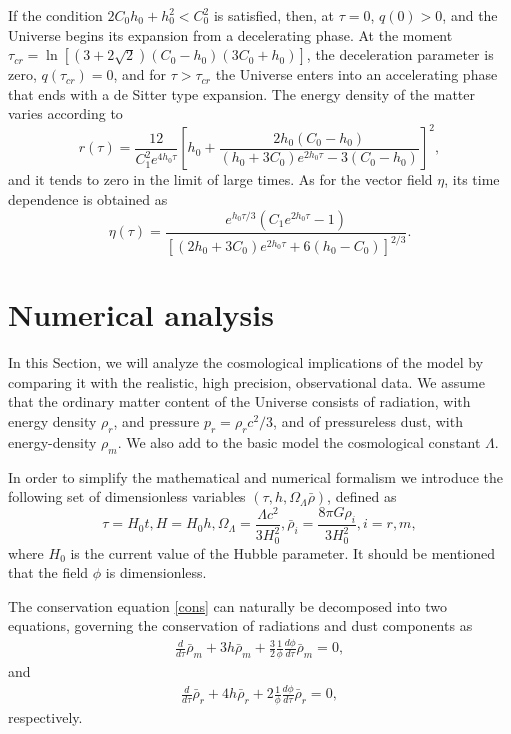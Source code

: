 \documentclass[aps,superscriptaddress, showpacs,preprintnumbers, superscriptaddress, nofootinbibt,twocolumn]{revtex4-2}
\def\be{\begin{equation}}
\def\ee{\end{equation}}
\begin{document}
If the condition  $2C_0h_0+h_0^2<C_0^2$ is satisfied, then, at $\tau =0$, $q(0)>0$, and the Universe begins its expansion from a decelerating phase. At the moment $\tau _{cr}=\ln \left[\left(3+2\sqrt{2}\right)\left(C_0-h_0\right)\left(3C_0+h_0\right)\right]$, the deceleration parameter is zero, $q\left(\tau _{cr}\right)=0$, and for $\tau >\tau_{cr}$ the Universe enters into an accelerating phase that ends with a de Sitter type expansion. The energy density of the matter varies according to
\be
r(\tau)=\frac{12}{C_1^2e^{4h_0\tau}}\left[h_0+\frac{2h_0\left(C_0-h_0\right)}{\left(h_0+3C_0\right)e^{2h_0\tau}-3\left(C_0-h_0\right)}\right]^2,
\ee
and it tends to zero in the limit of large times. As for the vector field $\eta$, its time dependence is obtained as
\begin{equation}
\eta \left( \tau \right) =\frac{e^{h_{0}\tau /3}\left( C_{1}e^{2h_{0}\tau
}-1\right) }{\left[ \left( 2h_{0}+3C_{0}\right) e^{2h_{0}\tau }+6\left(
h_{0}-C_{0}\right) \right] ^{2/3}}.
\end{equation}

\section{Numerical analysis}\label{sect5}

In this Section, we will analyze the cosmological implications of the model by comparing it with the realistic, high precision,  observational data. We assume that the ordinary matter content of the Universe consists of radiation, with energy density $\rho_r$, and pressure $p_r=\rho_r c^2/3$, and of pressureless dust, with energy-density $\rho_m$. We also add to the basic model the cosmological constant $\Lambda$.

In order to simplify the mathematical and numerical formalism  we introduce the following set of dimensionless variables $\left(\tau, h, \Omega _{\Lambda}\bar{\rho}\right)$, defined as
\be
\tau=H_0t, H=H_0h,\Omega_\Lambda=\frac{\Lambda c^2}{3H_0^2},\bar\rho_i=\frac{8\pi G\rho_i}{3H_0^2}, i=r,m,
\ee
where $H_0$ is the current value of the Hubble parameter.
It should be mentioned that the field $\phi$ is dimensionless. %

The conservation equation \eqref{cons} can naturally be decomposed into two equations, governing the conservation of radiations and dust components as
\begin{align}\label{con1}
\frac{d}{d\tau}\bar{\rho}_m+3h\bar\rho_m+\frac32\frac{1}{\phi}\frac{d\phi}{d\tau}\bar\rho_m=0,
\end{align}
and
\begin{align}\label{con2}
\frac{d}{d\tau }\bar{\rho}_r+4h\bar\rho_r+2\frac{1}{\phi}\frac{d\phi}{d\tau}\bar\rho_r=0,
\end{align}
respectively.
\end{document}
